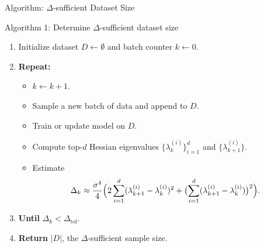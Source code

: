 \documentclass{beamer}
\begin{document}
\begin{frame}{Algorithm: \(\Delta\)-sufficient Dataset Size}
    \begin{block}{Algorithm 1: Determine \(\Delta\)-sufficient dataset size}
        \begin{enumerate}
            \item Initialize dataset \(D \gets \emptyset\) and batch counter \(k \gets 0\).
            \item \textbf{Repeat:}
                  \begin{itemize}
                      \item \(k \gets k + 1\).
                      \item Sample a new batch of data and append to \(D\).
                      \item Train or update model on \(D\).
                      \item Compute top-\(d\) Hessian eigenvalues \(\{\lambda_k^{(i)}\}_{i=1}^d\) and \(\{\lambda_{k+1}^{(i)}\}\).
                      \item Estimate
                            \[
                                \Delta_k \approx \frac{\sigma^4}{4}\Bigl(2\sum_{i=1}^d(\lambda_{k+1}^{(i)}-\lambda_k^{(i)})^2
                                + \bigl(\sum_{i=1}^d(\lambda_{k+1}^{(i)}-\lambda_k^{(i)})\bigr)^2\Bigr).
                            \]
                  \end{itemize}
            \item \textbf{Until} \(\Delta_k < \Delta_{\text{tol}}\).
            \item \textbf{Return} \(|D|\), the \(\Delta\)-sufficient sample size.
        \end{enumerate}
    \end{block}
\end{frame}
\end{document}
